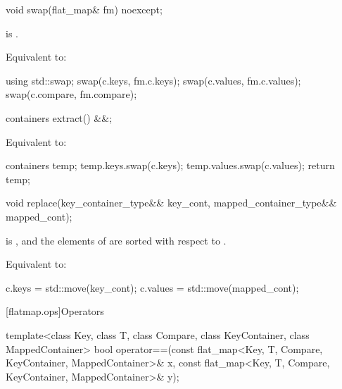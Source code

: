 \begin{codeblock}
\begin{codeblock}
\begin{codeblock}
\begin{addedblock}
%
\begin{itemdecl}
void swap(flat_map& fm) noexcept;
\end{itemdecl}

\begin{itemdescr}
\pnum \constraints {} is .

\pnum \effects Equivalent to:
\begin{codeblock}
using std::swap;
swap(c.keys, fm.c.keys);
swap(c.values, fm.c.values);
swap(c.compare, fm.compare);
\end{codeblock}
\end{itemdescr}

%
\begin{itemdecl}
containers extract() &&;
\end{itemdecl}

\begin{itemdescr}
\effects Equivalent to:
\begin{codeblock}
containers temp;
temp.keys.swap(c.keys);
temp.values.swap(c.values);
return temp;
\end{codeblock}
\end{itemdescr}

%
\begin{itemdecl}
void replace(key_container_type&& key_cont, mapped_container_type&& mapped_cont);
\end{itemdecl}

\begin{itemdescr}
\pnum \expects
{} is , and the elements of
 are sorted with respect to .

\pnum
\effects Equivalent to:
\begin{codeblock}
c.keys = std::move(key_cont);
c.values = std::move(mapped_cont);
\end{codeblock}
\end{itemdescr}

[flatmap.ops]{Operators}

%
\begin{itemdecl}
template<class Key, class T, class Compare, class KeyContainer, class MappedContainer>
  bool operator==(const flat_map<Key, T, Compare, KeyContainer, MappedContainer>& x,
                  const flat_map<Key, T, Compare, KeyContainer, MappedContainer>& y);
\end{itemdecl}


\end{addedblock}
\end{codeblock}
\end{codeblock}
\end{codeblock}
